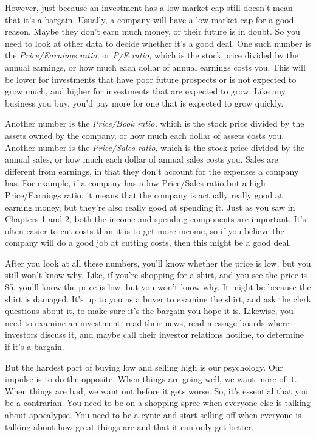 However, just because an investment has a low market cap still doesn't mean that it's a bargain. Usually, a company will have a low market cap for a good reason. Maybe they don't earn much money, or their future is in doubt. So you need to look at other data to decide whether it's a good deal. One such number is the \emph{Price/Earnings ratio,} or \emph{P/E ratio,} which is the stock price divided by the annual earnings, or how much each dollar of annual earnings costs you. This will be lower for investments that have poor future prospects or is not expected to grow much, and higher for investments that are expected to grow. Like any business you buy, you'd pay more for one that is expected to grow quickly.

Another number is the \emph{Price/Book ratio,} which is the stock price divided by the assets owned by the company, or how much each dollar of assets costs you. Another number is the \emph{Price/Sales ratio,} which is the stock price divided by the annual sales, or how much each dollar of annual sales costs you. Sales are different from earnings, in that they don't account for the expenses a company has. For example, if a company has a low Price/Sales ratio but a high Price/Earnings ratio, it means that the company is actually really good at earning money, but they're also really good at spending it. Just as you saw in Chapters 1 and 2, both the income and spending components are important. It's often easier to cut costs than it is to get more income, so if you believe the company will do a good job at cutting costs, then this might be a good deal.

After you look at all these numbers, you'll know whether the price is low, but you still won't know why. Like, if you're shopping for a shirt, and you see the price is \$5, you'll know the price is low, but you won't know why. It might be because the shirt is damaged. It's up to you as a buyer to examine the shirt, and ask the clerk questions about it, to make sure it's the bargain you hope it is. Likewise, you need to examine an investment, read their news, read message boards where investors discuss it, and maybe call their investor relations hotline, to determine if it's a bargain.

But the hardest part of buying low and selling high is our psychology. Our impulse is to do the opposite. When things are going well, we want more of it. When things are bad, we want out before it gets worse. So, it's essential that you be a contrarian. You need to be on a shopping spree when everyone else is talking about apocalypse. You need to be a cynic and start selling off when everyone is talking about how great things are and that it can only get better.

